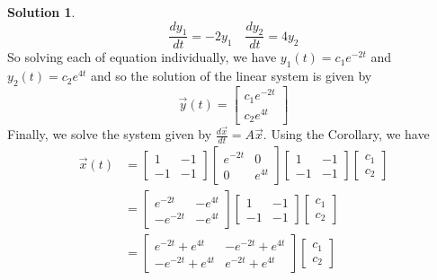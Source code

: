 \documentclass[11pt]{article}
\theoremstyle{definition}\newtheorem{definition}{Definition}
\theoremstyle{definition}\newtheorem{question}{Question}
\theoremstyle{definition}\newtheorem*{solution}{Solution}
\theoremstyle{definition}\newtheorem{example}{Example}
\theoremstyle{definition}\newtheorem{notation}{Notation}
\theoremstyle{theorem}\newtheorem{theorem}{Theorem}
\theoremstyle{theorem}\newtheorem{corollary}{Corollary}
\theoremstyle{theorem}\newtheorem{lemma}{Lemma}
\theoremstyle{theorem}\newtheorem{proposition}{Proposition}
\begin{document}
\begin{solution}
    \begin{equation*}
        \frac{dy_1}{dt} = -2y_1 \quad \frac{dy_2}{dt} = 4y_2
    \end{equation*}
    So solving each of equation individually, we have $y_1(t) = c_1e^{-2t}$ and $y_2(t) = c_2e^{4t}$ and so the solution of the linear system is given by
    \begin{equation*}
        \vec{y}(t) = \begin{bmatrix} c_1e^{-2t} \\ c_2e^{4t} \end{bmatrix}
    \end{equation*}
    Finally, we solve the system given by $\frac{d\vec{x}}{dt} = A\vec{x}$. Using the Corollary, we have
    \begin{align*}
        \vec{x}(t) &= \begin{bmatrix} 1 & -1 \\ -1 & -1 \end{bmatrix}\begin{bmatrix} e^{-2t} & 0 \\ 0 & e^{4t} \end{bmatrix} \begin{bmatrix} 1 & -1 \\ -1 & -1 \end{bmatrix} \begin{bmatrix} c_1 \\ c_2 \end{bmatrix} \\
        &= \begin{bmatrix} e^{-2t} & -e^{4t} \\ -e^{-2t} & -e^{4t} \end{bmatrix} \begin{bmatrix} 1 & -1 \\ -1 & -1 \end{bmatrix} \begin{bmatrix} c_1 \\ c_2 \end{bmatrix} \\
        &= \begin{bmatrix} e^{-2t} + e^{4t} & -e^{-2t} + e^{4t} \\ -e^{-2t} + e^{4t} & e^{-2t} + e^{4t} \end{bmatrix}\begin{bmatrix} c_1 \\ c_2 \end{bmatrix}
    \end{align*}
\end{solution}
\end{document}
